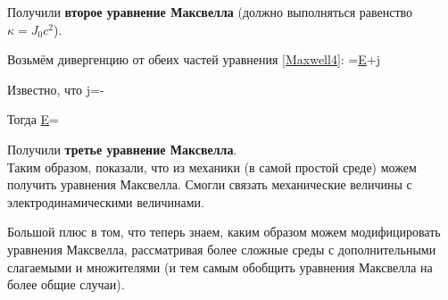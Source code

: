 \documentclass[main.tex]{subfiles}
\begin{document}
Получили \textbf{второе уравнение Максвелла} (должно выполняться равенство $\kappa=J_0c^2$).

Возьмём дивергенцию от обеих частей уравнения \eqref{Maxwell4}:
=\nabla\cdot\underline{E}+\nabla\cdot\underline{j}
\eeq

Известно, что
\beq
\nabla\cdot\underline{j}=-
\eeq

Тогда
\beq
{}\nabla\cdot\underline{E}=
\eeq

Получили \textbf{третье уравнение Максвелла}.\\

Таким образом, показали, что из механики (в самой простой среде) можем получить уравнения Максвелла. Смогли связать механические величины с электродинамическими величинами. 

Большой плюс в том, что теперь знаем, каким образом можем модифицировать уравнения Максвелла, рассматривая более сложные среды с дополнительными слагаемыми и множителями (и тем самым обобщить уравнения Максвелла на более общие случаи).
\end{document}
